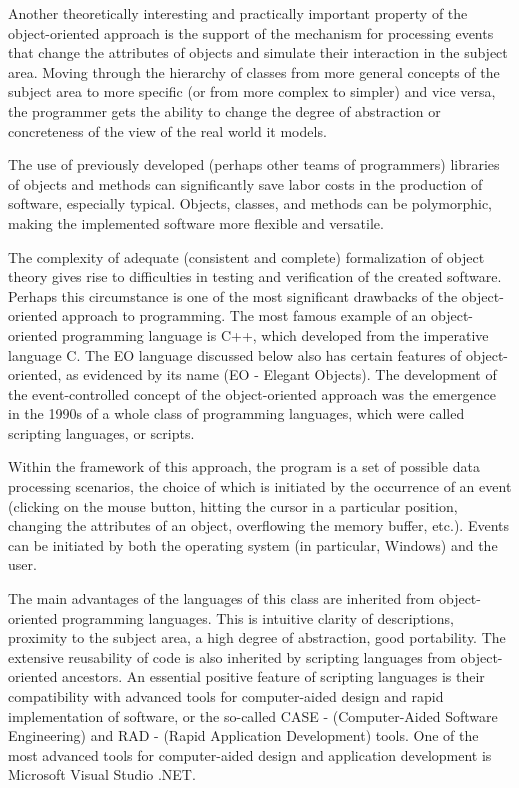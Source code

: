 \documentclass[12pt]{book}
\begin{document}
Another theoretically interesting and practically important property of the object-oriented approach is the support of the mechanism for processing events that change the attributes of objects and simulate their interaction in the subject area. Moving through the hierarchy of classes from more general concepts of the subject area to more specific (or from more complex to simpler) and vice versa, the programmer gets the ability to change the degree of abstraction or concreteness of the view of the real world it models.

The use of previously developed (perhaps other teams of programmers) libraries of objects and methods can significantly save labor costs in the production of software, especially typical. Objects, classes, and methods can be polymorphic, making the implemented software more flexible and versatile.

The complexity of adequate (consistent and complete) formalization of object theory gives rise to difficulties in testing and verification of the created software. Perhaps this circumstance is one of the most significant drawbacks of the object-oriented approach to programming.
The most famous example of an object-oriented programming language is C++, which developed from the imperative language C. The EO language discussed below also has certain features of object-oriented, as evidenced by its name (EO - Elegant  Objects).
The development of the event-controlled concept of the object-oriented approach was the emergence in the 1990s of a whole class of programming languages, which were called scripting languages, or scripts.

Within the framework of this approach, the program is a set of possible data processing scenarios, the choice of which is initiated by the occurrence of an event (clicking on the mouse button, hitting the cursor in a particular position, changing the attributes of an object, overflowing the memory buffer, etc.). Events can be initiated by both the operating system (in particular, Windows) and the user.

The main advantages of the languages of this class are inherited from object-oriented programming languages. This is intuitive clarity of descriptions, proximity to the subject area, a high degree of abstraction, good portability. The extensive reusability of code is also inherited by scripting languages from object-oriented ancestors.
An essential positive feature of scripting languages is their compatibility with advanced tools for computer-aided design and rapid implementation of software, or the so-called CASE - (Computer-Aided  Software Engineering) and RAD - (Rapid  Application Development) tools. One of the most advanced tools for computer-aided design and application development is Microsoft Visual Studio .NET.
\end{document}
